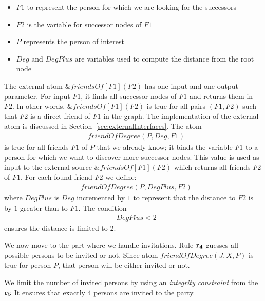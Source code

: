 \documentclass[a4paper, titlepage]{article}
\newcommand{\mi}[1]{\mathit{#1}}
\newcommand{\ext}[3]{\ensuremath{\&{\mathit{#1}}[#2](#3)}}
\newcommand{\row}[1]{%
  \ensuremath{\color{black}\ensuremath{\mathbf{#1}} \color{black}}%
}
\begin{document}
\begin{itemize}
\item $\mathit{F1}$ to represent the person for which we are 
looking for the successors

\item $\mathit{F2}$ is the variable for successor 
nodes of $F1$ 

\item $P$ represents the person of interest

\item $\mathit{Deg}$ and $\mi{DegPlus}$ are variables used to 
compute the distance from the root node
\end{itemize}
The external atom \ext{friendsOf}{F1}{F2} has one input and 
one output parameter. For input $\mathit{F1}$, 
it finds all successor nodes of $\mi{F1}$ and returns them in 
$\mathit{F2}$.
%
In other words, \ext{friendsOf}{F1}{F2} is true for all pairs
$(\mi{F1},\mi{F2})$ such that
$\mi{F2}$ is a direct friend of $\mi{F1}$ in the graph.
%
The implementation of the external atom is 
discussed in Section~\ref{sec:externalInterfaces}.
%
The atom
\begin{align*}
& \mathit{friendOfDegree}(P, Deg, F1)
\end{align*}
is true for all friends $\mi{F1}$ of $P$ that we already know;
it binds the variable $\mathit{F1}$ to a person for which we 
want to discover more successor nodes.
%
This value is used as input to 
the external source \ext{friendsOf}{F1}{F2} 
which returns all friends $F2$ of $F1$.
For each found friend $F2$ we define:
\begin{align*}
& \mathit{friendOfDegree}(P, \mi{DegPlus}, F2)
\end{align*} 
where $\mathit{DegPlus}$ is $\mathit{Deg}$ incremented by 
$1$ to represent that the distance to $F2$ is by $1$ 
greater than to $F1$. The condition
\begin{align*}
& \mathit{DegPlus} < 2
\end{align*}
ensures the distance is limited to 2. 

We now move to the part where we handle invitations. Rule $\row{r_4}$ guesses all possible 
persons to be invited or not. Since atom 
$\mathit{friendOfDegree(J, X, P)}$ is true for person $P$, that person will be either invited or not.

We limit the number of invited persons by using an 
\emph{integrity constraint} from the $\row{r_5}$
It ensures that exactly 4 persons are invited to the party. 
\end{document}
